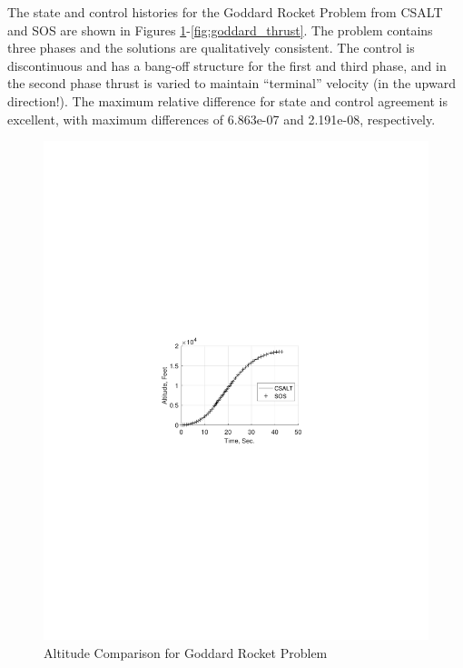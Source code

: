 \documentclass[ISTS  ]{tjsass} %
\begin{document}
The state and control histories for the Goddard Rocket Problem from CSALT and SOS are shown in Figures \ref{fig:goddard_alt}-\ref{fig:goddard_thrust}.  The problem contains three phases and the solutions are qualitatively consistent.  The control is discontinuous and has a bang-off structure for the first and third phase, and in the second phase thrust is varied to maintain “terminal” velocity (in the upward direction!).  The maximum relative difference for state and control agreement is excellent, with maximum differences of 6.863e-07 and 2.191e-08, respectively.
%
\begin{figure} [h]
    \centering
    \includegraphics[width=\columnwidth]{../Figures/GoddardRocket_AlitudeVsTime}
    \caption{Altitude Comparison for Goddard Rocket Problem}
    \label{fig:goddard_alt}
\end{figure}
%
\end{document}
